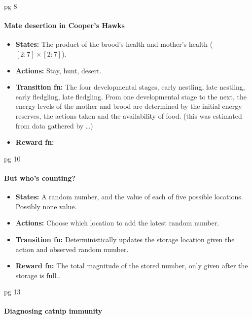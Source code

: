 \cite{Putterman2015} pg 8

\hypertarget{mate-desertion-in-coopers-hawks}{%
\paragraph{Mate desertion in Cooper's
Hawks}\label{mate-desertion-in-coopers-hawks}}

\begin{itemize}
\tightlist
\item
  \textbf{States:} The product of the brood's health and mother's health
  (\([2:7] \times [2:7]\)).
\item
  \textbf{Actions:} Stay, hunt, desert.
\item
  \textbf{Transition fn:} The four developmental stages, early nestling,
  late nestling, early fledgling, late fledgling. From one developmental
  stage to the next, the energy levels of the mother and brood are
  determined by the initial energy reserves, the actions taken and the
  availability of food. (this was estimated from data gathered by
  \ldots{})
\item
  \textbf{Reward fn:}
\end{itemize}

\cite{Putterman2015} pg 10

\hypertarget{but-whos-counting}{%
\paragraph{But who's counting?}\label{but-whos-counting}}

\begin{itemize}
\tightlist
\item
  \textbf{States:} A random number, and the value of each of five
  possible locations. Possibly none value.
\item
  \textbf{Actions:} Choose which location to add the latest random
  number.
\item
  \textbf{Transition fn:} Deterministically updates the storage location
  given the action and observed random number.
\item
  \textbf{Reward fn:} The total magnitude of the stored number, only
  given after the storage is full..
\end{itemize}

\cite{Putterman2015} pg 13

\hypertarget{diagnosing-catnip-immunity}{%
\paragraph{Diagnosing catnip
immunity}\label{diagnosing-catnip-immunity}}

